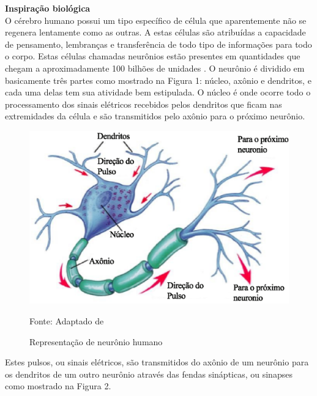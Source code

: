 \noindent
\textbf{Inspiração biológica} \\

    O cérebro humano possui um tipo específico de célula que aparentemente não se regenera lentamente como as outras. A estas células são atribuídas a capacidade de pensamento, lembranças e transferência de todo tipo de informações para todo o corpo. Estas células chamadas neurônios estão presentes em quantidades que chegam a aproximadamente 100 bilhões de unidades \cite{anderson1992artificial}.
    O neurônio é dividido em basicamente três partes como mostrado na Figura 1: núcleo, axônio e dendritos, e cada uma delas tem sua atividade bem estipulada. O núcleo é onde ocorre todo o processamento dos sinais elétricos recebidos pelos dendritos que ficam nas extremidades da célula e são transmitidos pelo axônio para o próximo neurônio.

    \begin{figure}[ht]
        \centering
        \label{fig01}
            \includegraphics[keepaspectratio=true, scale=0.4]{editaveis/images/neuronio.eps}
        \caption{Representação de neurônio humano}
        Fonte: Adaptado de \cite{marieb2009}
    \end{figure}

    Estes pulsos, ou sinais elétricos, são transmitidos do axônio de um neurônio para os dendritos de um outro neurônio através das fendas sinápticas, ou sinapses como mostrado na Figura 2.

